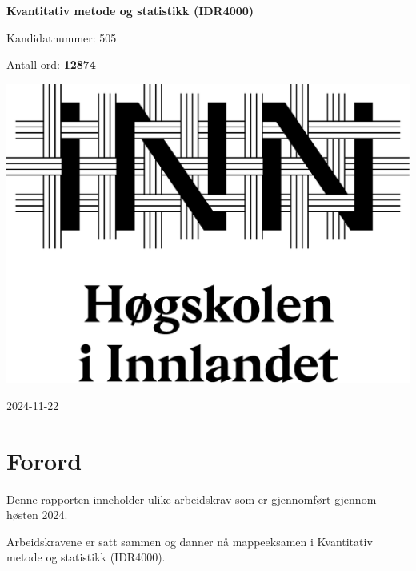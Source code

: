 \documentclass[
  letterpaper,
  DIV=11,
  numbers=noendperiod]{scrreprt}
\author{}
\date{}
\renewcommand*\contentsname{Table of contents}
\newcommand\contentsname{Table of contents}
\begin{document}
\begin{titlepage}
\begin{center}
\vspace*{1cm}

{\Huge \textbf{Kvantitativ metode og statistikk (IDR4000)}}

\vspace{1cm}
{\Large Kandidatnummer: 505}

\vspace{1cm}
Antall ord: \textbf{12874} %

\vspace{5cm}
\includegraphics[width=1.6\textwidth]{logo.png}

\vfill
{\large 2024-11-22}

\end{center}
\end{titlepage}

\renewcommand*\contentsname{Table of contents}
{
\hypersetup{linkcolor=}
\setcounter{tocdepth}{2}
\tableofcontents
}


\chapter*{Forord}\label{forord}


Denne rapporten inneholder ulike arbeidskrav som er gjennomført gjennom
høsten 2024.

Arbeidskravene er satt sammen og danner nå mappeeksamen i Kvantitativ
metode og statistikk (IDR4000).
\end{document}
